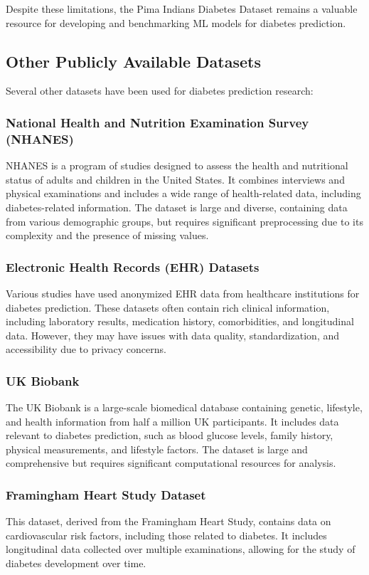 \documentclass[journal]{IEEEtran}
\begin{document}
Despite these limitations, the Pima Indians Diabetes Dataset remains a valuable resource for developing and benchmarking ML models for diabetes prediction.

\subsection{Other Publicly Available Datasets}
Several other datasets have been used for diabetes prediction research:

\subsubsection{National Health and Nutrition Examination Survey (NHANES)}
NHANES is a program of studies designed to assess the health and nutritional status of adults and children in the United States. It combines interviews and physical examinations and includes a wide range of health-related data, including diabetes-related information. The dataset is large and diverse, containing data from various demographic groups, but requires significant preprocessing due to its complexity and the presence of missing values.

\subsubsection{Electronic Health Records (EHR) Datasets}
Various studies have used anonymized EHR data from healthcare institutions for diabetes prediction. These datasets often contain rich clinical information, including laboratory results, medication history, comorbidities, and longitudinal data. However, they may have issues with data quality, standardization, and accessibility due to privacy concerns.

\subsubsection{UK Biobank}
The UK Biobank is a large-scale biomedical database containing genetic, lifestyle, and health information from half a million UK participants. It includes data relevant to diabetes prediction, such as blood glucose levels, family history, physical measurements, and lifestyle factors. The dataset is large and comprehensive but requires significant computational resources for analysis.

\subsubsection{Framingham Heart Study Dataset}
This dataset, derived from the Framingham Heart Study, contains data on cardiovascular risk factors, including those related to diabetes. It includes longitudinal data collected over multiple examinations, allowing for the study of diabetes development over time.
\end{document}

